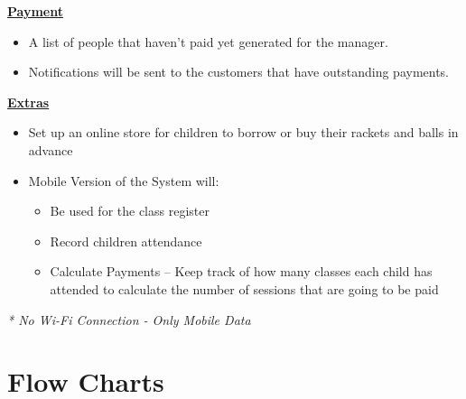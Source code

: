 \documentclass{l3proj}
\begin{document}
\textbf{\underline{Payment}}
	\begin{itemize}
	\item A list of people that haven't paid yet generated for the manager.
	\item Notifications will be sent to the customers that have outstanding payments.
	\end{itemize}
\textbf{\underline{Extras}}
	\begin{itemize}
		\item Set up an online store for children to borrow or buy their rackets and balls in advance
		\item Mobile Version of the System will:
		\begin{itemize}
			\item Be used for the class register
			\item Record children attendance
			\item Calculate Payments -- Keep track of how many classes each child has attended to calculate the number of sessions that are going to be paid
		\end{itemize}
	\end{itemize}
\emph{* No Wi-Fi Connection - Only Mobile Data}\\
\noindent\makebox[\linewidth]{\rule{\paperwidth}{0.4pt}}
\pagebreak

\section{Flow Charts}

\end{document}
